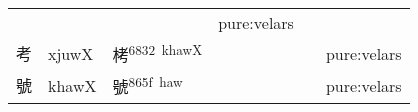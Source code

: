 \documentclass[14pt,a4paper]{scrartcl}
\begin{document}
\begin{longtable}[c]{@{}llllll@{}}
\begin{minipage}[t]{0.14\columnwidth}
\strut\end{minipage} &
\begin{minipage}[t]{0.14\columnwidth}\raggedright\strut
\strut\end{minipage} &
\begin{minipage}[t]{0.14\columnwidth}\raggedright\strut
\strut\end{minipage} &
\begin{minipage}[t]{0.14\columnwidth}\raggedright\strut
pure:velars
\strut\end{minipage}\tabularnewline
\begin{minipage}[t]{0.14\columnwidth}\raggedright\strut
考
\strut\end{minipage} &
\begin{minipage}[t]{0.14\columnwidth}\raggedright\strut
xjuwX
\strut\end{minipage} &
\begin{minipage}[t]{0.14\columnwidth}\raggedright\strut
栲\textsuperscript{6832~khawX}
\strut\end{minipage} &
\begin{minipage}[t]{0.14\columnwidth}\raggedright\strut
\strut\end{minipage} &
\begin{minipage}[t]{0.14\columnwidth}\raggedright\strut
\strut\end{minipage} &
\begin{minipage}[t]{0.14\columnwidth}\raggedright\strut
pure:velars
\strut\end{minipage}\tabularnewline
\begin{minipage}[t]{0.14\columnwidth}\raggedright\strut
號
\strut\end{minipage} &
\begin{minipage}[t]{0.14\columnwidth}\raggedright\strut
khawX
\strut\end{minipage} &
\begin{minipage}[t]{0.14\columnwidth}\raggedright\strut
號\textsuperscript{865f~haw}
\strut\end{minipage} &
\begin{minipage}[t]{0.14\columnwidth}\raggedright\strut
\strut\end{minipage} &
\begin{minipage}[t]{0.14\columnwidth}\raggedright\strut
\strut\end{minipage} &
\begin{minipage}[t]{0.14\columnwidth}\raggedright\strut
pure:velars
\strut\end{minipage}\tabularnewline

\end{longtable}
\end{document}
